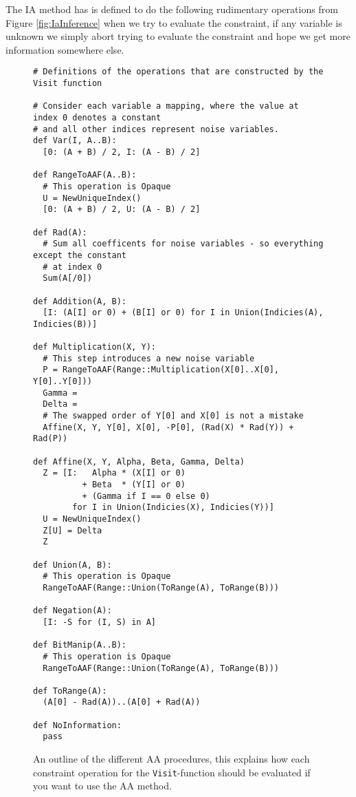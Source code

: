 The IA method has is defined to do the following rudimentary operations from Figure \ref{fig:IaInference} when we try to evaluate the constraint, if any variable is unknown we simply abort trying to evaluate the constraint and hope we get more information somewhere else.

\begin{figure}
\begin{verbatim}
# Definitions of the operations that are constructed by the Visit function

# Consider each variable a mapping, where the value at index 0 denotes a constant
# and all other indices represent noise variables.
def Var(I, A..B):
  [0: (A + B) / 2, I: (A - B) / 2]

def RangeToAAF(A..B):
  # This operation is Opaque
  U = NewUniqueIndex()
  [0: (A + B) / 2, U: (A - B) / 2]

def Rad(A):
  # Sum all coefficents for noise variables - so everything except the constant
  # at index 0
  Sum(A[/0])

def Addition(A, B):
  [I: (A[I] or 0) + (B[I] or 0) for I in Union(Indicies(A), Indicies(B))]

def Multiplication(X, Y):
  # This step introduces a new noise variable
  P = RangeToAAF(Range::Multiplication(X[0]..X[0], Y[0]..Y[0]))
  Gamma = 
  Delta = 
  # The swapped order of Y[0] and X[0] is not a mistake
  Affine(X, Y, Y[0], X[0], -P[0], (Rad(X) * Rad(Y)) + Rad(P))

def Affine(X, Y, Alpha, Beta, Gamma, Delta)
  Z = [I:   Alpha * (X[I] or 0)
          + Beta  * (Y[I] or 0)
          + (Gamma if I == 0 else 0)
        for I in Union(Indicies(X), Indicies(Y))]
  U = NewUniqueIndex()
  Z[U] = Delta
  Z

def Union(A, B):
  # This operation is Opaque
  RangeToAAF(Range::Union(ToRange(A), ToRange(B)))
  
def Negation(A):
  [I: -S for (I, S) in A]

def BitManip(A..B):
  # This operation is Opaque
  RangeToAAF(Range::Union(ToRange(A), ToRange(B)))

def ToRange(A):
  (A[0] - Rad(A))..(A[0] + Rad(A))

def NoInformation:
  pass

\end{verbatim}
  \cprotect\caption{An outline of the different AA procedures, this explains how each constraint operation for the \verb+Visit+-function should be evaluated if you want to use the AA method.}
\label{fig:AaInference}
\end{figure}


